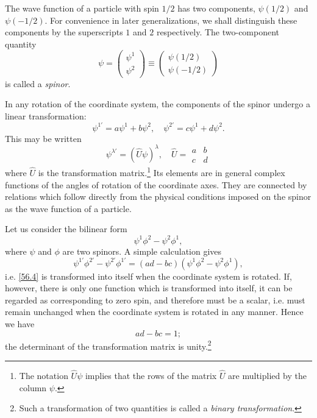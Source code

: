 The wave function of a particle with spin $ 1/2 $ has two components, $ \psi(1/2) $ and $ \psi(-1/2) $. For convenience in later generalizations, we shall distinguish these components by the superscripts $ 1 $ and $ 2 $ respectively. The two-component quantity
\begin{equation}\label{56.1}
\psi=\left(\begin{array}{c}
\psi^1\\\psi^2
\end{array} \right)\equiv\left(\begin{array}{c}
\psi\left(1/2\right)\\\psi\left(-1/2\right)
\end{array} \right)
\end{equation}
is called a \textit{spinor}.

In any rotation of the coordinate system, the components of the spinor undergo a linear transformation:
\begin{equation}\label{56.2}
\psi^{1'}=a\psi^1+b\psi^2,\quad\psi^{2'}=c\psi^1+d\psi^2.
\end{equation}
This may be written
\begin{equation}\label{56.3}
\psi^{\lambda'}=(\hat{U}\psi)^\lambda,\quad\hat{U}=\begin{array}{cc}
a&b\\
c&d
\end{array}
\end{equation}
where $\hat{U}$ is the transformation matrix.\footnote{The notation $ \hat{U}\psi $ implies that the rows of the matrix $\hat{U}$ are multiplied by the column $\psi$.} Its elements are in general complex functions of the angles of rotation of the coordinate axes. They are connected by relations which follow directly from the physical conditions imposed on the spinor as the wave function of a particle.

Let us consider the bilinear form
\begin{equation}\label{56.4}
\psi^1\phi^2-\psi^2\phi^1,
\end{equation}
where $\psi$ and $\phi$ are two spinors. A simple calculation gives
\[ \psi^{1'}\phi^{2'}-\psi^{2'}\phi^{1'}=(ad-bc)(\psi^1\phi^2-\psi^2\phi^1), \]
i.e. \eqref{56.4} is transformed into itself when the coordinate system is rotated. If, however, there is only one function which is transformed into itself, it can be regarded as corresponding to zero spin, and therefore must be a scalar, i.e. must remain unchanged when the coordinate system is rotated in any manner. Hence we have
\begin{equation}\label{56.5}
ad-bc=1;
\end{equation}
the determinant of the transformation matrix is unity.\footnote{Such a transformation of two quantities is called a \textit{binary transformation}.}

